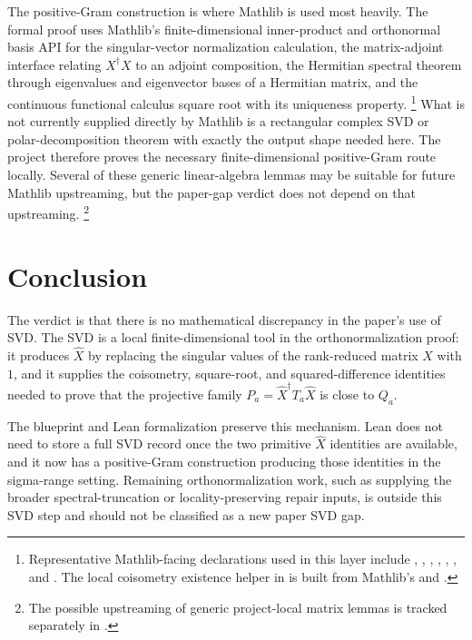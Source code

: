 \documentclass[11pt]{article}
\begin{document}
The positive-Gram construction is where Mathlib is used most heavily.  The
formal proof uses Mathlib's finite-dimensional inner-product and orthonormal
basis API for the singular-vector normalization calculation, the matrix-adjoint
interface relating $X^\dagger X$ to an adjoint composition, the Hermitian
spectral theorem through eigenvalues and eigenvector bases of a Hermitian
matrix, and the continuous functional calculus square root with its uniqueness
property.%
\footnote{Representative Mathlib-facing declarations used in this layer include
, ,
,
,
, , and
.  The local coisometry existence helper
 in
 is built from Mathlib's
 and .}
What is not currently supplied directly by Mathlib is a rectangular complex SVD
or polar-decomposition theorem with exactly the output shape needed here.  The
project therefore proves the necessary finite-dimensional positive-Gram route
locally.  Several of these generic linear-algebra lemmas may be suitable for
future Mathlib upstreaming, but the paper-gap verdict does not depend on that
upstreaming.%
\footnote{The possible upstreaming of generic project-local matrix lemmas is
tracked separately in .}

\section{Conclusion}

The verdict is that there is no mathematical discrepancy in the paper's use of
SVD.  The SVD is a local finite-dimensional tool in the orthonormalization proof:
it produces $\widehat X$ by replacing the singular values of the rank-reduced
matrix $X$ with $1$, and it supplies the coisometry, square-root, and
squared-difference identities needed to prove that the projective family
$P_a=\widehat X^\dagger T_a\widehat X$ is close to $Q_a$.

The blueprint and Lean formalization preserve this mechanism.  Lean does not
need to store a full SVD record once the two primitive $\widehat X$ identities
are available, and it now has a positive-Gram construction producing those
identities in the sigma-range setting.  Remaining orthonormalization work, such
as supplying the broader spectral-truncation or locality-preserving repair
inputs, is outside this SVD step and should not be classified as a new paper
SVD gap.



\end{document}
